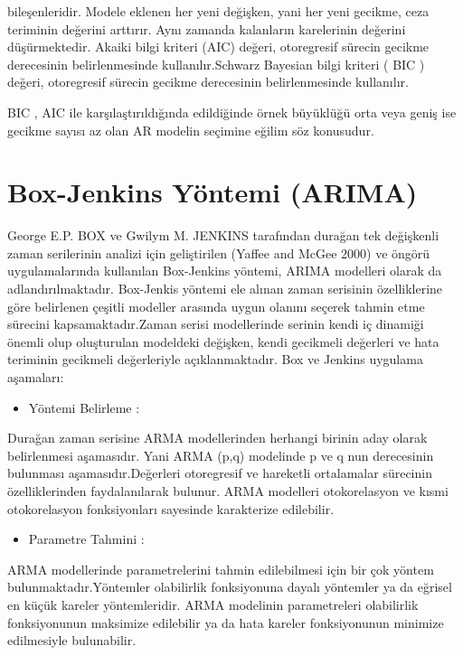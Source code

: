 \documentclass[11pt]{article}
\providecommand{\tightlist}{%
      \setlength{\itemsep}{0pt}\setlength{\parskip}{0pt}}
\begin{document}
bileşenleridir. Modele eklenen her yeni değişken, yani her yeni gecikme,
ceza teriminin değerini arttırır. Aynı zamanda kalanların karelerinin
değerini düşürmektedir. Akaiki bilgi kriteri (AIC) değeri, otoregresif
sürecin gecikme derecesinin belirlenmesinde kullanılır.Schwarz Bayesian
bilgi kriteri ( BIC ) değeri, otoregresif sürecin gecikme derecesinin
belirlenmesinde kullanılır.

BIC , AIC ile karşılaştırıldığında edildiğinde örnek büyüklüğü orta veya
geniş ise gecikme sayısı az olan AR modelin seçimine eğilim söz
konusudur.

    \section{Box-Jenkins Yöntemi
(ARIMA)}\label{box-jenkins-yuxf6ntemi-arima}

George E.P. BOX ve Gwilym M. JENKINS tarafından durağan tek değişkenli
zaman serilerinin analizi için geliştirilen (Yaffee and McGee 2000) ve
öngörü uygulamalarında kullanılan Box-Jenkins yöntemi, ARIMA modelleri
olarak da adlandırılmaktadır. Box-Jenkis yöntemi ele alınan zaman
serisinin özelliklerine göre belirlenen çeşitli modeller arasında uygun
olanını seçerek tahmin etme sürecini kapsamaktadır.Zaman serisi
modellerinde serinin kendi iç dinamiği önemli olup oluşturulan modeldeki
değişken, kendi gecikmeli değerleri ve hata teriminin gecikmeli
değerleriyle açıklanmaktadır. Box ve Jenkins uygulama aşamaları:

\begin{itemize}
\tightlist
\item
  Yöntemi Belirleme :
\end{itemize}

Durağan zaman serisine ARMA modellerinden herhangi birinin aday olarak
belirlenmesi aşamasıdır. Yani ARMA (p,q) modelinde p ve q nun
derecesinin bulunması aşamasıdır.Değerleri otoregresif ve hareketli
ortalamalar sürecinin özelliklerinden faydalanılarak bulunur. ARMA
modelleri otokorelasyon ve kısmi otokorelasyon fonksiyonları sayesinde
karakterize edilebilir.

\begin{itemize}
\tightlist
\item
  Parametre Tahmini :
\end{itemize}

ARMA modellerinde parametrelerini tahmin edilebilmesi için bir çok
yöntem bulunmaktadır.Yöntemler olabilirlik fonksiyonuna dayalı yöntemler
ya da eğrisel en küçük kareler yöntemleridir. ARMA modelinin
parametreleri olabilirlik fonksiyonunun maksimize edilebilir ya da hata
kareler fonksiyonunun minimize edilmesiyle bulunabilir.
\end{document}
